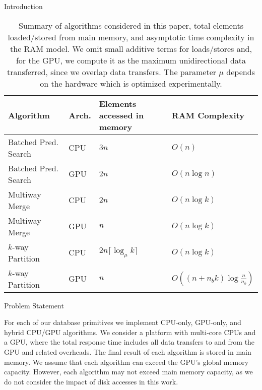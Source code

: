 \documentclass[final]{beamer}
\newlength{\colwidth}
\begin{document}
\begin{frame}[t]
\begin{columns}[t]
\begin{column}{\colwidth}
\begin{block}{Introduction}
\begin{table}[htp]
    \centering
    \begin{footnotesize}
    \caption{Summary of algorithms considered in this paper, total elements loaded/stored from main memory, 
             and asymptotic time complexity in the RAM model.  We omit small additive terms for loads/stores and, 
             for the GPU, we compute it as the maximum unidirectional data transferred, since we overlap data transfers.  
             The parameter $\mu$ depends on the hardware which is optimized experimentally.} 
    \label{tab:algorithms}
    \begin{tabularx}{\columnwidth}{|l|l|X|X|} \hline
    Algorithm& Arch. & Elements accessed in memory & RAM Complexity \\ \hline
    Batched Pred. Search & CPU& $3n$ & $O(n)$ \\
    \hline
    Batched Pred. Search & GPU& $2n$ & $O(n\log{n})$ \\\hline
    Multiway Merge & CPU& $2n$ & $O(n\log{k})$ \\\hline
    Multiway Merge & GPU& $n$ & $O(n\log{k})$ \\\hline
    $k$-way Partition               & CPU& $2n\lceil\log_{\mu}{k}\rceil$ & $O(n\log{k})$ \\\hline
    $k$-way Partition               & GPU& $n$ & $O((n+n_bk) \log{\frac{n}{n_b}})$ \\
    \hline
    \end{tabularx}
    \end{footnotesize}

    \end{table}

  \end{block}

  \begin{alertblock}{Problem Statement}

   For each of our database primitives we implement CPU-only, GPU-only, and hybrid CPU/GPU algorithms. 
   We consider a platform with multi-core CPUs and a GPU, where the total response time includes all 
   data transfers to and from the GPU and related overheads. The final result of each algorithm is 
   stored in main memory. We assume that each algorithm can exceed the GPU's global memory capacity. 
   However, each algorithm may not exceed main memory capacity, as we do not consider the impact of disk accesses in this work.

  \end{alertblock}

\end{column}


\end{columns}
\end{frame}
\end{document}
